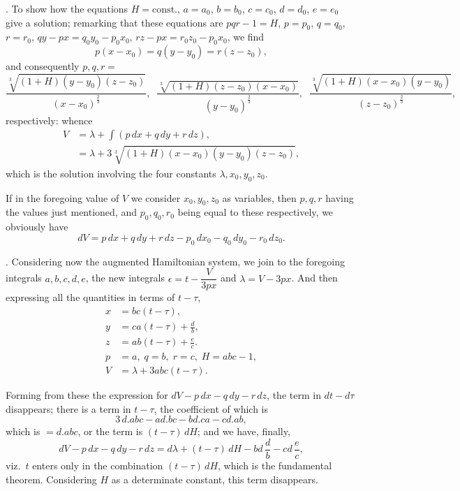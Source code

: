 \documentclass[11pt,a4paper]{article}
\begin{document}
\medskip

. To show how the equations $H = \text{const.}$, $a = a_{0}$, $b = b_{0}$, $c = c_{0}$, $d = d_{0}$, $e = e_{0}$ give a solution; remarking that these equations are $pqr - 1 = H$, $p = p_{0}$, $q = q_{0}$, $r = r_{0}$, $qy - px = q_{0}y_{0} - p_{0}x_{0}$, $rz - px = r_{0}z_{0} - p_{0}x_{0}$, we find
\[
p(x - x_{0}) = q(y - y_{0}) = r(z - z_{0}),
\]
and consequently $p, q, r =$
\[
\frac{\sqrt[3]{(1 + H)(y - y_{0})(z - z_{0})}}{(x - x_{0})^{\tfrac{2}{3}}}, \;\; \frac{\sqrt[3]{(1 + H)(z - z_{0})(x - x_{0})}}{(y - y_{0})^{\tfrac{2}{3}}}, \;\; \frac{\sqrt[3]{(1 + H)(x - x_{0})(y - y_{0})}}{(z - z_{0})^{\tfrac{2}{3}}},
\]
respectively: whence
\[
\begin{aligned}
V &= \lambda + \int (p\,dx + q\,dy + r\,dz), \\
&= \lambda + 3\sqrt[3]{(1 + H)(x - x_{0})(y - y_{0})(z - z_{0})},
\end{aligned}
\]
which is the solution involving the four constants $\lambda, x_{0}, y_{0}, z_{0}$.

If in the foregoing value of $V$ we consider $x_{0}, y_{0}, z_{0}$ as variables, then $p, q, r$ having the values just mentioned, and $p_{0}, q_{0}, r_{0}$ being equal to these respectively, we obviously have
\[
dV = p\,dx + q\,dy + r\,dz - p_{0}\,dx_{0} - q_{0}\,dy_{0} - r_{0}\,dz_{0}.
\]

\medskip

. Considering now the augmented Hamiltonian system, we join to the foregoing integrals $a, b, c, d, e$, the new integrals $\epsilon = t - \dfrac{V}{3px}$ and $\lambda = V - 3px$. And then expressing all the quantities in terms of $t - \tau$,
\[
\begin{aligned}
x &= bc(t - \tau), \\
y &= ca(t - \tau) + \frac{d}{b}, \\
z &= ab(t - \tau) + \frac{e}{c}. \\
p &= a, \; q = b, \; r = c, \; H = abc - 1, \\
V &= \lambda + 3abc(t - \tau).
\end{aligned}
\]

\newpage


Forming from these the expression for $dV - p\,dx - q\,dy - r\,dz$, the term in $dt - d\tau$ disappears; there is a term in $t - \tau$, the coefficient of which is
\[
3\,d.abc - ad.bc - bd.ca - cd.ab,
\]
which is $= d.abc$, or the term is $(t - \tau)\,dH$; and we have, finally,
\[
dV - p\,dx - q\,dy - r\,dz = d\lambda + (t - \tau)\,dH - bd\,\frac{d}{b} - cd\,\frac{e}{c},
\]
viz.\ $t$ enters only in the combination $(t - \tau)\,dH$, which is the fundamental theorem. Considering $H$ as a determinate constant, this term disappears.
\end{document}
